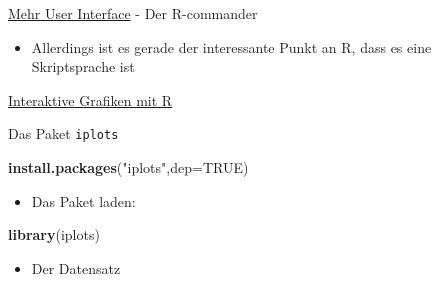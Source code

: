 \documentclass[
  ignorenonframetext,
]{beamer}
\newenvironment{Shaded}{}{}
\newcommand{\DataTypeTok}[1]{\textcolor[rgb]{0.56,0.13,0.00}{#1}}
\newcommand{\KeywordTok}[1]{\textcolor[rgb]{0.00,0.44,0.13}{\textbf{#1}}}
\newcommand{\NormalTok}[1]{#1}
\newcommand{\OperatorTok}[1]{\textcolor[rgb]{0.40,0.40,0.40}{#1}}
\newcommand{\OtherTok}[1]{\textcolor[rgb]{0.00,0.44,0.13}{#1}}
\newcommand{\StringTok}[1]{\textcolor[rgb]{0.25,0.44,0.63}{#1}}
\providecommand{\tightlist}{%
  \setlength{\itemsep}{0pt}\setlength{\parskip}{0pt}}
\begin{document}
\begin{frame}[fragile]{\href{http://www.linuxlinks.com/article/20110306113701179/GUIsforR.html}{Mehr
User Interface} - Der R-commander}
\begin{itemize}
\tightlist
\item
  Allerdings ist es gerade der interessante Punkt an R, dass es eine
  Skriptsprache ist
\end{itemize}

\end{frame}

\begin{frame}[fragile]{\href{http://www.statmethods.net/advgraphs/interactive.html}{Interaktive
Grafiken mit R}}
\protect\hypertarget{interaktive-grafiken-mit-r}{}

Das Paket \texttt{iplots}

\begin{Shaded}
\begin{Highlighting}[]
\KeywordTok{install.packages}\NormalTok{(}\StringTok{"iplots"}\NormalTok{,}\DataTypeTok{dep=}\OtherTok{TRUE}\NormalTok{)}
\end{Highlighting}
\end{Shaded}

\begin{itemize}
\tightlist
\item
  Das Paket laden:
\end{itemize}

\begin{Shaded}
\begin{Highlighting}[]
\KeywordTok{library}\NormalTok{(iplots)}
\end{Highlighting}
\end{Shaded}

\begin{itemize}
\tightlist
\item
  Der Datensatz
\end{itemize}

\begin{Shaded}
\end{Shaded}

\end{frame}
\end{document}
